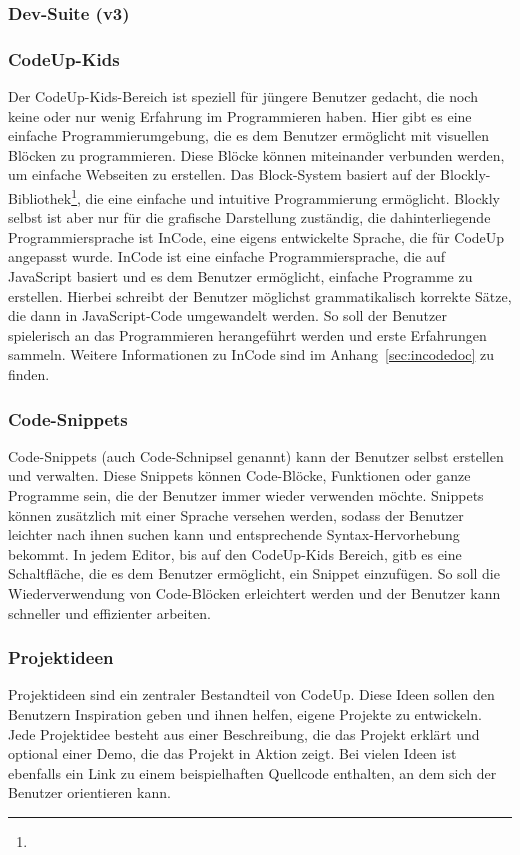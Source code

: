 \documentclass[main.tex]{subfiles}
\begin{document}
    \subsubsection{Dev-Suite (v3)}
    \subsubsection{CodeUp-Kids}
    Der CodeUp-Kids-Bereich ist speziell für jüngere Benutzer gedacht, die noch keine oder nur wenig Erfahrung im Programmieren haben.
    Hier gibt es eine einfache Programmierumgebung, die es dem Benutzer ermöglicht mit visuellen Blöcken zu programmieren.
    Diese Blöcke können miteinander verbunden werden, um einfache Webseiten zu erstellen.
    Das Block-System basiert auf der Blockly-Bibliothek\footnote{}, die eine einfache und intuitive Programmierung ermöglicht.
    Blockly selbst ist aber nur für die grafische Darstellung zuständig, die dahinterliegende Programmiersprache ist InCode, eine eigens entwickelte Sprache, die für CodeUp angepasst wurde.
    InCode ist eine einfache Programmiersprache, die auf JavaScript basiert und es dem Benutzer ermöglicht, einfache Programme zu erstellen.
    Hierbei schreibt der Benutzer möglichst grammatikalisch korrekte Sätze, die dann in JavaScript-Code umgewandelt werden.
    So soll der Benutzer spielerisch an das Programmieren herangeführt werden und erste Erfahrungen sammeln.
    Weitere Informationen zu InCode sind im Anhang~\ref{sec:incodedoc} zu finden.
    \subsubsection{Code-Snippets}
    Code-Snippets (auch Code-Schnipsel genannt) kann der Benutzer selbst erstellen und verwalten.
    Diese Snippets können Code-Blöcke, Funktionen oder ganze Programme sein, die der Benutzer immer wieder verwenden möchte.
    Snippets können zusätzlich mit einer Sprache versehen werden, sodass der Benutzer leichter nach ihnen suchen kann und entsprechende Syntax-Hervorhebung bekommt.
    In jedem Editor, bis auf den CodeUp-Kids Bereich, gitb es eine Schaltfläche, die es dem Benutzer ermöglicht, ein Snippet einzufügen.
    So soll die Wiederverwendung von Code-Blöcken erleichtert werden und der Benutzer kann schneller und effizienter arbeiten.
    \subsubsection{Projektideen}
    Projektideen sind ein zentraler Bestandteil von CodeUp.
    Diese Ideen sollen den Benutzern Inspiration geben und ihnen helfen, eigene Projekte zu entwickeln.
    Jede Projektidee besteht aus einer Beschreibung, die das Projekt erklärt und optional einer Demo, die das Projekt in Aktion zeigt.
    Bei vielen Ideen ist ebenfalls ein Link zu einem beispielhaften Quellcode enthalten, an dem sich der Benutzer orientieren kann.
\end{document}
